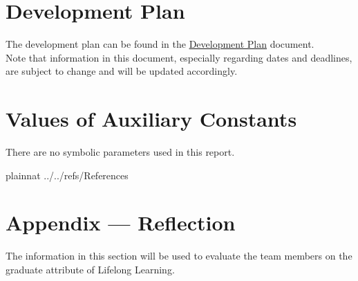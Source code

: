 \documentclass[12pt]{article}
\begin{document}



\newpage

\section{Development Plan}

The development plan can be found in the
\href{https://github.com/PlutosCapstone/Plutos/blob/main/docs/DevelopmentPlan/DevelopmentPlan.pdf}{Development
Plan} document. \\

\noindent Note that information in this document, especially regarding dates and deadlines, are subject to change and will be updated accordingly. \\


\section{Values of Auxiliary Constants}

There are no symbolic parameters used in this report.

\newpage

 {plainnat}
 {../../refs/References}

\newpage


\newpage{}
\section*{Appendix --- Reflection}


The information in this section will be used to evaluate the team members on the
graduate attribute of Lifelong Learning.  
\end{document}
